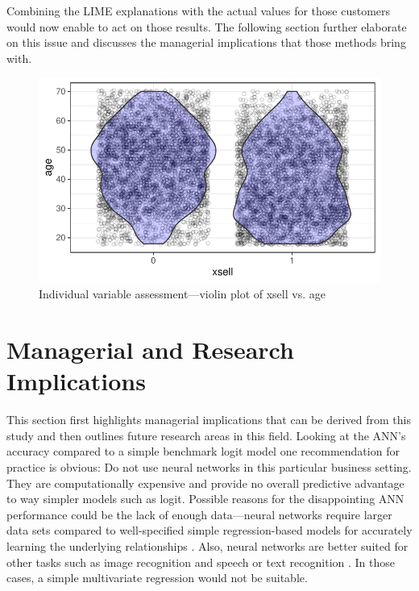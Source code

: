 \documentclass[12pt,a4paper]{article}
\begin{document}
Combining the LIME explanations with the actual values for those customers would now enable to act on those results.
The following section further elaborate on this issue and discusses the managerial implications that those methods bring with.

\begin{figure}[ht]
	\centering
  \includegraphics[scale=0.83]{figures/violin_age_xsell.pdf}
	\caption{Individual variable assessment---violin plot of xsell vs. age}
	\label{fig_violin_age}
\end{figure}

\section{Managerial and Research Implications} \label{sec_man_impl}
This section first highlights managerial implications that can be derived from this study and then outlines future research areas in this field.
Looking at the ANN's accuracy compared to a simple benchmark logit model one recommendation for practice is obvious:
Do not use neural networks in this particular business setting.
They are computationally expensive and provide no overall predictive advantage to way simpler models such as logit.
Possible reasons for the disappointing ANN performance could be the lack of enough data---neural networks require larger data sets compared
to well-specified simple regression-based models for accurately learning the underlying relationships \citep{chanClassifierDesignComputeraided1999}.
Also, neural networks are better suited for other tasks such as image recognition \citep{estevaDermatologistlevelClassificationSkin2017} and speech \citep{hintonDeepNeuralNetworks2012} or text recognition \citep{jaderbergSyntheticDataArtificial2014}.
In those cases, a simple multivariate regression would not be suitable.
\end{document}
